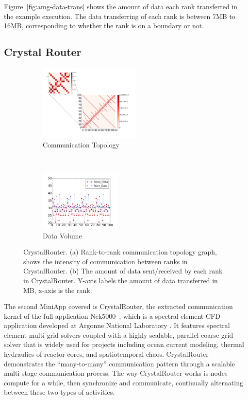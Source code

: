 \documentclass[conference]{IEEEtran}
\begin{document}
Figure~\ref{fig:amg-data-trans} shows the amount of data each rank transferred in the example execution. The data transferring of each rank is between 7MB to 16MB, corresponding to whether the rank is on a boundary or not.

\subsection{Crystal Router}
\label{sec:crystalrouter}

\begin{figure}[t!]
    \centering
    \begin{subfigure}[t]{0.25\textwidth}
        \centering
        \includegraphics[height=1.5in]{figs/appstudy/cr/cr_pip}
        \caption{Communication Topology}
        \label{fig:cr-communication-topology}
    \end{subfigure}
    ~
    \begin{subfigure}[t]{0.22\textwidth}
        \centering
        \includegraphics[height=1.2in]{figs/appstudy/cr/cr_data_transfer}
        \caption{Data Volume}
        \label{fig:cr-data-trans}
    \end{subfigure}
    \caption{CrystalRouter. (a) Rank-to-rank communication topology graph, shows the intensity of communication between ranks in CrystalRouter. (b) The amount of data sent/received by each rank in CrystalRouter. Y-axis labels the amount of data transferred in MB, x-axis is the rank. }
\end{figure}

The second MiniApp covered is CrystalRouter, the extracted communication kernel of the full application Nek5000~\cite{crystalrouter}, which is a spectral element CFD application developed at Argonne National Laboratory \cite{nek5000}. It features spectral element multi-grid solvers coupled with a highly scalable, parallel coarse-grid solver that is widely used for projects including ocean current modeling, thermal hydraulics of reactor cores, and spatiotemporal chaos. CrystalRouter demonstrates the ``many-to-many'' communication pattern through a scalable multi-stage communication process. The way CrystalRouter works is nodes compute for a while, then synchronize and communicate, continually alternating between these two types of activities.
\end{document}
